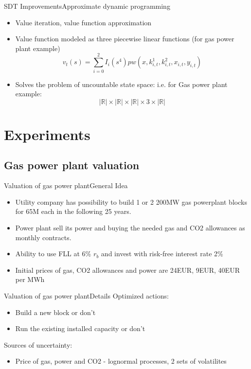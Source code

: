 \documentclass[us]{beamer}
\begin{document}
\begin{frame}{SDT Improvements}{Approximate dynamic programming}
		\begin{itemize}
			\item{Value iteration, value function approximation}
			\item{Value function modeled as three piecewise linear functions (for gas power plant example)}
			\begin{equation}
				v_t(s) = \sum_{i=0}^{2} I_{i}(s^4) pw(x, k_{i,t}^1, k_{i,t}^2, x_{i,t}, y_{i,t})
			\end{equation}
			\item{Solves the problem of uncountable state space: i.e. for Gas power plant example:}
			\begin{equation}
				|\mathbb{R}| \times |\mathbb{R}| \times |\mathbb{R}| \times 3  \times |\mathbb{R}|
			\end{equation}
		\end{itemize}
\end{frame}

\section{Experiments}


\subsection{Gas power plant valuation}
	
	
	\begin{frame}{Valuation of gas power plant}{General Idea}
	\begin{itemize}
		\item {Utility company has possibility to build 1 or 2 200MW gas powerplant blocks for 65M each in the following 25 years.}
		\item {Power plant sell its power and buying the needed gas and CO2 allowances as monthly contracts.}		
		\item {Ability to use FLL at 6\% $r_b$ and invest with risk-free interest rate 2\%}
		\item {Initial prices of gas, CO2 allowances and power are 24EUR, 9EUR, 40EUR per MWh}
		
	\end{itemize}
	\end{frame}

	\begin{frame}{Valuation of gas power plant}{Details}
	Optimized actions:
	\begin{itemize}
		\item {Build a new block or don't}
		\item {Run the existing installed capacity or don't}
	\end{itemize}
	
	Sources of uncertainty: 
	\begin{itemize}
		\item {Price of gas, power and CO2 - lognormal processes, 2 sets of volatilites}
	\end{itemize}	
	\end{frame}
	
\end{document}
